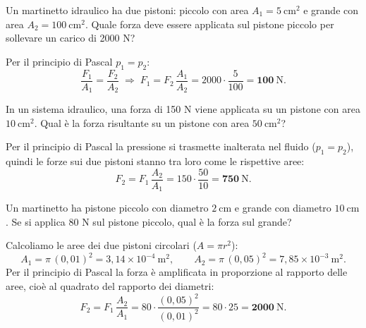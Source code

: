 \begin{question}[ID=2.1, subtitle={Forza sul pistone piccolo del martinetto}, tags={fluidi, Pascal, martinetto}, difficulty=facile]
Un martinetto idraulico ha due pistoni: piccolo con area $A_1 = 5\ \mathrm{cm^2}$ e grande con area $A_2 = 100\ \mathrm{cm^2}$. Quale forza deve essere applicata sul pistone piccolo per sollevare un carico di 2000 N?
\begin{solution}
Per il principio di Pascal $p_1 = p_2$:
\[
\frac{F_1}{A_1} = \frac{F_2}{A_2}
\;\Rightarrow\;
F_1 = F_2\,\frac{A_1}{A_2} = 2000 \cdot \frac{5}{100} = \mathbf{100\ \mathrm{N}}.
\]
\end{solution}
\end{question}


\begin{question}[ID=2.2, subtitle={Forza amplificata dal sistema idraulico}, tags={fluidi, Pascal, martinetto}, difficulty=facile]
In un sistema idraulico, una forza di 150 N viene applicata su un pistone con area $10\ \mathrm{cm^2}$. Qual è la forza risultante su un pistone con area $50\ \mathrm{cm^2}$?
\begin{solution}
Per il principio di Pascal la pressione si trasmette inalterata nel fluido ($p_1 = p_2$), quindi le forze sui due pistoni stanno tra loro come le rispettive aree:
\[
F_2 = F_1\,\frac{A_2}{A_1} = 150 \cdot \frac{50}{10} = \mathbf{750\ \mathrm{N}}.
\]
\end{solution}
\end{question}


\begin{question}[ID=2.3, subtitle={Martinetto con pistoni di diametro 2 cm e 10 cm}, tags={fluidi, Pascal, martinetto}, difficulty=facile]
Un martinetto ha pistone piccolo con diametro $2\ \mathrm{cm}$ e grande con diametro $10\ \mathrm{cm}$. Se si applica 80 N sul pistone piccolo, qual è la forza sul grande?
\begin{solution}
Calcoliamo le aree dei due pistoni circolari ($A = \pi r^2$):
\[
A_1 = \pi\,(0{,}01)^2 = 3{,}14\times10^{-4}\ \mathrm{m^2}, \qquad A_2 = \pi\,(0{,}05)^2 = 7{,}85\times10^{-3}\ \mathrm{m^2}.
\]
Per il principio di Pascal la forza è amplificata in proporzione al rapporto delle aree, cioè al quadrato del rapporto dei diametri:
\[
F_2 = F_1\,\frac{A_2}{A_1} = 80\cdot\frac{(0{,}05)^2}{(0{,}01)^2} = 80\cdot 25 = \mathbf{2000\ \mathrm{N}}.
\]
\end{solution}
\end{question}


